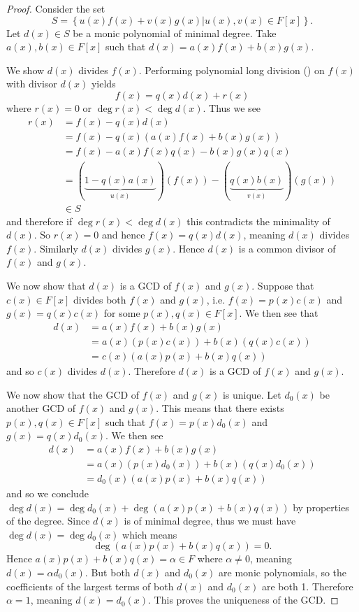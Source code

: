 \begin{proof}
    Consider the set
    \[
        S = \left\{u(x)f(x) + v(x)g(x) \vert u(x), v(x) \in F[x]\right\}.
    \]
    Let $d(x) \in S$ be a monic polynomial of minimal degree. Take $a(x),b(x) \in F[x]$ such that $d(x) = a(x)f(x) + b(x)g(x)$.

    We show $d(x)$ divides $f(x)$. Performing polynomial long division () on $f(x)$ with divisor $d(x)$ yields
    \[
        f(x) = q(x)d(x) + r(x)
    \]
    where $r(x) = 0$ or $\deg r(x) < \deg d(x)$. Thus we see
    \begin{align*}
        r(x) &= f(x) - q(x)d(x)\\
        &= f(x)-q(x)\left(a(x)f(x) + b(x)g(x)\right)\\
        &= f(x) - a(x)f(x)q(x) - b(x)g(x)q(x)\\
        &= (\underbrace{1 - q(x)a(x)}_{u(x)})(f(x)) - (\underbrace{q(x)b(x)}_{v(x)})(g(x))\\
        &\in S
    \end{align*}
    and therefore if $\deg r(x) < \deg d(x)$ this contradicts the minimality of $d(x)$. So $r(x) = 0$ and hence $f(x) = q(x)d(x)$, meaning $d(x)$ divides $f(x)$. Similarly $d(x)$ divides $g(x)$. Hence $d(x)$ is a common divisor of $f(x)$ and $g(x)$.

    We now show that $d(x)$ is a GCD of $f(x)$ and $g(x)$. Suppose that $c(x) \in F[x]$ divides both $f(x)$ and $g(x)$, i.e. $f(x) = p(x)c(x)$ and $g(x) = q(x)c(x)$ for some $p(x), q(x) \in F[x]$. We then see that
    \begin{align*}
        d(x) &= a(x)f(x) + b(x)g(x)\\
        &= a(x)(p(x)c(x)) + b(x)(q(x)c(x))\\
        &= c(x)(a(x)p(x) + b(x)q(x))
    \end{align*}
    and so $c(x)$ divides $d(x)$. Therefore $d(x)$ is a GCD of $f(x)$ and $g(x)$.

    We now show that the GCD of $f(x)$ and $g(x)$ is unique. Let $d_0(x)$ be another GCD of $f(x)$ and $g(x)$. This means that there exists $p(x), q(x) \in F[x]$ such that $f(x) = p(x)d_0(x)$ and $g(x) = q(x)d_0(x)$. We then see
    \begin{align*}
        d(x) &= a(x)f(x) + b(x)g(x)\\
        &= a(x)(p(x)d_0(x)) + b(x)(q(x)d_0(x))\\
        &= d_0(x)(a(x)p(x) + b(x)q(x))
    \end{align*}
    and so we conclude $\deg d(x) = \deg d_0(x) + \deg\left(a(x)p(x) + b(x)q(x)\right)$ by properties of the degree. Since $d(x)$ is of minimal degree, thus we must have $\deg d(x) = \deg d_0(x)$ which means
    \[
        \deg\left(a(x)p(x) + b(x)q(x)\right) = 0.
    \]
    Hence $a(x)p(x) + b(x)q(x) = \alpha \in F$ where $\alpha \neq 0$, meaning $d(x) = \alpha d_0(x)$. But both $d(x)$ and $d_0(x)$ are monic polynomials, so the coefficients of the largest terms of both $d(x)$ and $d_0(x)$ are both 1. Therefore $\alpha = 1$, meaning $d(x) = d_0(x)$. This proves the uniqueness of the GCD.
\end{proof}

